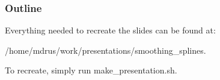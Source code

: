 \begin{frame}
  \frametitle{Outline}
  \tableofcontents
\end{frame}
%
%
\begin{frame}
  Everything needed to recreate the slides can be found at:
  \par
  \begin{center} 
  /home/mdrus/work/presentations/smoothing\_splines.
  \par
  \end{center}
  To recreate, simply run make\_presentation.sh.
\end{frame}
